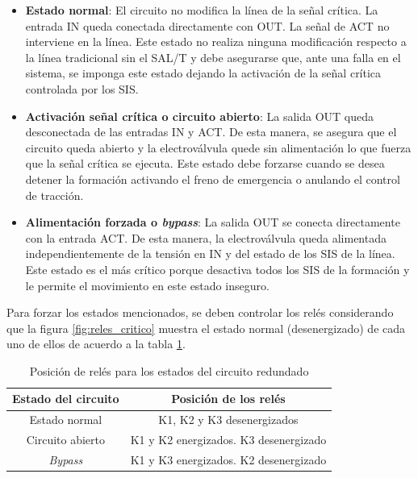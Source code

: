 \begin{itemize}
    \item \textbf{Estado normal}: El circuito no modifica la línea de la señal crítica. La entrada IN queda conectada directamente con OUT. La señal de ACT no interviene en la línea. Este estado no realiza ninguna modificación respecto a la línea tradicional sin el SAL/T y debe asegurarse que, ante una falla en el sistema, se imponga este estado dejando la activación de la señal crítica controlada por los SIS. 

    \item \textbf{Activación señal crítica o circuito abierto}: La salida OUT queda desconectada de las entradas IN y ACT. De esta manera, se asegura que el circuito queda abierto y la electroválvula quede sin alimentación lo que fuerza que la señal crítica se ejecuta. Este estado debe forzarse cuando se desea detener la formación activando el freno de emergencia o anulando el control de tracción. 

    \item \textbf{Alimentación forzada o \textit{bypass}}: La salida OUT se conecta directamente con la entrada ACT. De esta manera, la electroválvula queda alimentada independientemente de la tensión en IN y del estado de los SIS de la línea. Este estado es el más crítico porque desactiva todos los SIS de la formación y le permite el movimiento en este estado inseguro. 

\end{itemize}

Para forzar los estados mencionados, se deben controlar los relés considerando que la figura \ref{fig:reles_critico} muestra el estado normal (desenergizado) de cada uno de ellos de acuerdo a la tabla \ref{tab:estado_rele}.

\begin{table}[htb]


    \begin{tabular}{|c|c|} 
        \hline
        \textbf{Estado del circuito} & \textbf{Posición de los relés}\\
        \hline
        Estado normal     &     K1, K2 y K3 desenergizados   \\
        \hline
        Circuito abierto   &     K1 y K2 energizados. K3 desenergizado   \\
        \hline
        \textit{Bypass}   &     K1 y K3 energizados. K2 desenergizado   \\
        \hline
    \end{tabular}
\caption{Posición de relés para los estados del circuito redundado}
\label{tab:estado_rele}
\end{table}

